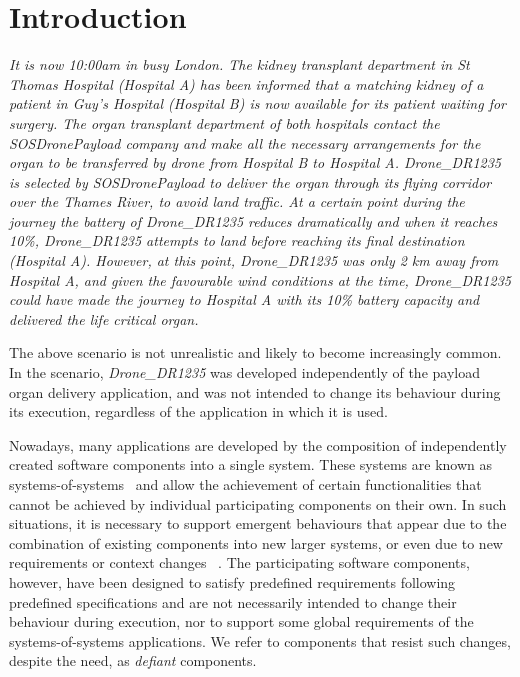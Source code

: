 \section{Introduction}

\textit{It is now 10:00am in busy London. The kidney transplant department in St Thomas Hospital (Hospital A) has been informed that a matching kidney of a patient in Guy's Hospital (Hospital B) is now available for its patient waiting for surgery. The organ transplant department of both hospitals contact the SOSDronePayload company and make all the necessary arrangements for the organ to be transferred by drone from Hospital B to Hospital A. Drone\_DR1235 is selected by SOSDronePayload to deliver the organ through its flying corridor over the Thames River, to avoid land traffic. At a certain point during the journey the battery of Drone\_DR1235 reduces dramatically and when it reaches 10\%, Drone\_DR1235 attempts to land before reaching its final destination (Hospital A). However, at this point, Drone\_DR1235 was only 2 km away from Hospital A, 
and given the favourable wind conditions at the time, 
Drone\_DR1235 could have made the journey to Hospital A with its 10\% battery capacity and delivered the life critical organ.}

The above scenario is not unrealistic and likely to become increasingly common. In the scenario, \textit{Drone\_DR1235} was  developed independently of the payload organ delivery application, and was not intended to change its behaviour during its execution, regardless of the application in which it is used. 

Nowadays, many applications are developed by the composition of independently created software components into a single system. These systems are known as systems-of-systems~\cite{Maier98SOS} and allow the achievement of certain functionalities that cannot be achieved by individual participating components on their own.  In such situations, it is necessary to support emergent behaviours that appear due to the combination of existing components into new larger systems, or even due to new requirements or context changes ~\cite{SilvaSouza:2011:ARA:1988008.1988018}. The participating software components, however, have been designed to satisfy predefined requirements following predefined specifications and are not necessarily intended to change their behaviour during execution, nor to support some global requirements of the systems-of-systems applications. We refer to components that resist such changes, despite the need, as {\it defiant} components. 


